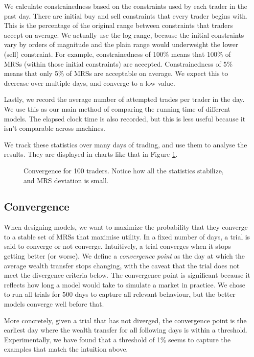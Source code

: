 \documentclass[12pt,a4paper,titlepage]{article}
\begin{document}
We calculate constrainedness based on the constraints used by each trader in the past day.
There are initial buy and sell constraints that every trader begins with.
This is the percentage of the original range between constraints that traders accept on average.
We actually use the log range, because the initial constraints vary by orders of magnitude and the plain range would underweight the lower (sell) constraint.
For example, constrainedness of 100\% means that 100\% of MRSs (within those initial constraints) are accepted.
Constrainedness of 5\% means that only 5\% of MRSs are acceptable on average.
We expect this to decrease over multiple days, and converge to a low value.

Lastly, we record the average number of attempted trades per trader in the day.
We use this as our main method of comparing the running time of different models.
The elapsed clock time is also recorded, but this is less useful because it isn't comparable across machines.

We track these statistics over many days of trading, and use them to analyse the results.
They are displayed in charts like that in Figure \ref{fig:conv}.

\begin{figure}[H]
    \centering
    
    \caption{
      Convergence for 100 traders.
      Notice how all the statistics stabilize, and MRS deviation is small.
    }
    \label{fig:conv}
\end{figure}

\subsection{Convergence}
When designing models, we want to maximize the probability that they converge to a stable set of MRSs that maximise utility.
In a fixed number of days, a trial is said to converge or not converge.
Intuitively, a trial converges when it stops getting better (or worse).
We define a \textit{convergence point} as the day at which the average wealth transfer stops changing, with the caveat that the trial does not meet the divergence criteria below.
The convergence point is significant because it reflects how long a model would take to simulate a market in practice.
We chose to run all trials for 500 days to capture all relevant behaviour, but the better models converge well before that.

More concretely, given a trial that has not diverged, the convergence point is the earliest day where the wealth transfer for all following days is within a threshold.
Experimentally, we have found that a threshold of 1\% seems to capture the examples that match the intuition above.
\end{document}
